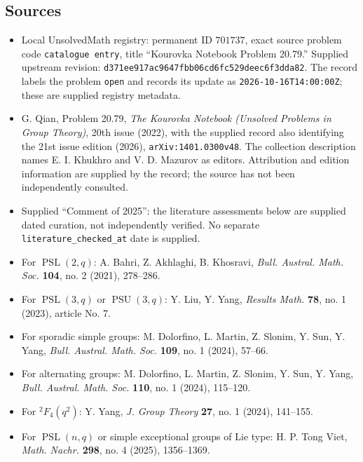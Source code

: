 \documentclass[11pt]{article}
\begin{document}
\subsection{Sources}
\begin{itemize}
\item Local UnsolvedMath registry: permanent ID \(701737\), exact source problem code \texttt{catalogue entry}, title ``Kourovka Notebook Problem 20.79.'' Supplied upstream revision: \texttt{d371ee917ac9647fbb06cd6fc529deec6f3dda82}. The record labels the problem \texttt{open} and records its update as \texttt{2026-10-16T14:00:00Z}; these are supplied registry metadata.
\item G. Qian, Problem 20.79, \emph{The Kourovka Notebook (Unsolved Problems in Group Theory)}, 20th issue (2022), with the supplied record also identifying the 21st issue edition (2026), \texttt{arXiv:1401.0300v48}. The collection description names E. I. Khukhro and V. D. Mazurov as editors. Attribution and edition information are supplied by the record; the source has not been independently consulted.
\item Supplied ``Comment of 2025'': the literature assessments below are supplied dated curation, not independently verified. No separate \texttt{literature\_checked\_at} date is supplied.
\item For \(\operatorname{PSL}(2,q)\): A. Bahri, Z. Akhlaghi, B. Khosravi, \emph{Bull. Austral. Math. Soc.} \textbf{104}, no. 2 (2021), 278--286.
\item For \(\operatorname{PSL}(3,q)\) or \(\operatorname{PSU}(3,q)\): Y. Liu, Y. Yang, \emph{Results Math.} \textbf{78}, no. 1 (2023), article No. 7.
\item For sporadic simple groups: M. Dolorfino, L. Martin, Z. Slonim, Y. Sun, Y. Yang, \emph{Bull. Austral. Math. Soc.} \textbf{109}, no. 1 (2024), 57--66.
\item For alternating groups: M. Dolorfino, L. Martin, Z. Slonim, Y. Sun, Y. Yang, \emph{Bull. Austral. Math. Soc.} \textbf{110}, no. 1 (2024), 115--120.
\item For \({}^{2}F_4(q^2)\): Y. Yang, \emph{J. Group Theory} \textbf{27}, no. 1 (2024), 141--155.
\item For \(\operatorname{PSL}(n,q)\) or simple exceptional groups of Lie type: H. P. Tong Viet, \emph{Math. Nachr.} \textbf{298}, no. 4 (2025), 1356--1369.
\end{itemize}
\end{document}
